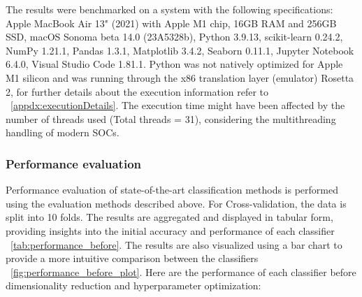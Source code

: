 	The results were benchmarked on a system with the following specifications: Apple MacBook Air 13" (2021) with Apple M1 chip, 16GB RAM and 256GB SSD, macOS Sonoma beta 14.0 (23A5328b), Python 3.9.13, scikit-learn 0.24.2, NumPy 1.21.1, Pandas 1.3.1, Matplotlib 3.4.2, Seaborn 0.11.1, Jupyter Notebook 6.4.0, Visual Studio Code 1.81.1. Python was not natively optimized for Apple M1 silicon and was running through the x86 translation layer (emulator) Rosetta 2, for further details about the execution information refer to \appendixname~\ref{appdx:executionDetails}. The execution time might have been affected by the number of threads used (Total threads = 31), considering the multithreading handling of modern SOCs.

\subsubsection{Performance evaluation}
	Performance evaluation of state-of-the-art classification methods is performed using the evaluation methods described above. For Cross-validation, the data is split into 10 folds. The results are aggregated and displayed in tabular form, providing insights into the initial accuracy and performance of each classifier \tablename~\ref{tab:performance_before}. The results are also visualized using a bar chart to provide a more intuitive comparison between the classifiers \figurename~\ref{fig:performance_before_plot}. Here are the performance of each classifier before dimensionality reduction and hyperparameter optimization:

